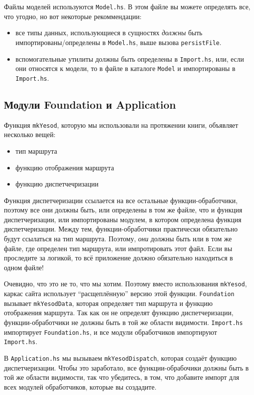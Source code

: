 Файлы моделей используются \lstinline!Model.hs!. В этом файле вы можете определять все, что угодно, но
вот некоторые рекоммендации:
\begin{itemize}
    \item все типы данных, использующиеся в сущностях \emph{должны} быть импортированы/определены
      в \lstinline!Model.hs!, выше вызова \lstinline!persistFile!.
    \item вспомогательные утилиты должны быть определены в \lstinline!Import.hs!, или, если они
      относятся к модели, то в файле в каталоге \lstinline!Model! и импортированы в \lstinline!Import.hs!.
\end{itemize}

\subsection{Модули Foundation и Application}

Функция \lstinline!mkYesod!, которую мы использовали на протяжении книги, объявляет несколько вещей:

\begin{itemize}
  \item тип маршрута
  \item функцию отображения маршрута
  \item функцию диспетчечризации
\end{itemize}

Функция диспетчеризации ссылается на все остальные функции-обработчики, поэтому все они должны быть,
или определены в том же файле, что и функция диспетчеризации, или импортированы модулем,
в котором определена функция диспетчеризации.
Между тем, функции-обработчики практически обязательно будут ссылаться на тип маршрута. Поэтому,
\emph{они} должны быть или в том же файле, где определен тип маршрута, или импротировать этот файл.
Если вы проследите за логикой, то всё приложение должно обязательно находиться в одном файле!

Очевидно, что это не то, что мы хотим. Поэтому вместо использования \lstinline!mkYesod!, каркас
сайта использует ``расщеплённую'' версию этой функции. \lstinline!Foundation! вызывает \lstinline!mkYesodData!,
которая определяет тип маршрута и функцию отображения маршрута. Так как он не определят функцию диспетчеризации,
функции-обработчики не должны быть в той же области видимости. \lstinline!Import.hs! импортирует
\lstinline!Foundation.hs!, и все модули обработчиков импортируют \lstinline!Import.hs!.

В \lstinline!Application.hs! мы вызываем \lstinline!mkYesodDispatch!, которая создаёт функцию диспетчеризации.
Чтобы это заработало, все функции-обрабочики должны быть в той же области видимости, так что убедитесь, в
том, что добавите импорт для всех модулей обработчиков, которые вы создадите.

